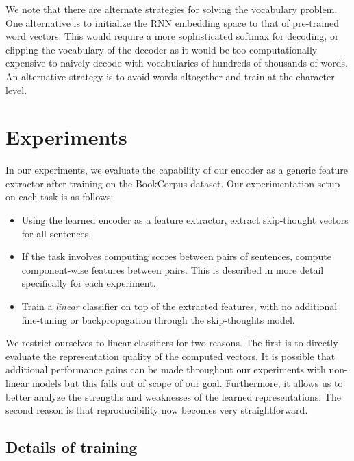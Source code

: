 \documentclass{article} \usepackage{nips15submit_e,times}
\begin{document}
We note that there are alternate strategies for solving the vocabulary problem. One alternative is to initialize the RNN embedding space to that of pre-trained word vectors. This would require a more sophisticated softmax for decoding, or clipping the vocabulary of the decoder as it would be too computationally expensive to naively decode with vocabularies of hundreds of thousands of words. An alternative strategy is to avoid words altogether and train at the character level. 

\section{Experiments}

In our experiments, we evaluate the capability of our encoder as a generic feature extractor after training on the BookCorpus dataset. Our experimentation setup on each task is as follows:
\begin{itemize}[leftmargin=*]
\item Using the learned encoder as a feature extractor, extract skip-thought vectors for all sentences.
\item If the task involves computing scores between pairs of sentences, compute component-wise features between pairs. This is described in more detail specifically for each experiment.
\item Train a {\it linear} classifier on top of the extracted features, with no additional fine-tuning or backpropagation through the skip-thoughts model.
\end{itemize}
We restrict ourselves to linear classifiers for two reasons. The first is to directly evaluate the representation quality of the computed vectors. It is possible that additional performance gains can be made throughout our experiments with non-linear models but this falls out of scope of our goal. Furthermore, it allows us to better analyze the strengths and weaknesses of the learned representations. The second reason is that reproducibility now becomes very straightforward.

\subsection{Details of training}
\end{document}
